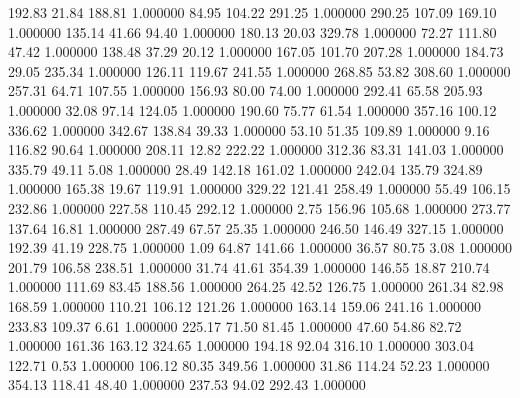     192.83     21.84    188.81  1.000000
     84.95    104.22    291.25  1.000000
    290.25    107.09    169.10  1.000000
    135.14     41.66     94.40  1.000000
    180.13     20.03    329.78  1.000000
     72.27    111.80     47.42  1.000000
    138.48     37.29     20.12  1.000000
    167.05    101.70    207.28  1.000000
    184.73     29.05    235.34  1.000000
    126.11    119.67    241.55  1.000000
    268.85     53.82    308.60  1.000000
    257.31     64.71    107.55  1.000000
    156.93     80.00     74.00  1.000000
    292.41     65.58    205.93  1.000000
     32.08     97.14    124.05  1.000000
    190.60     75.77     61.54  1.000000
    357.16    100.12    336.62  1.000000
    342.67    138.84     39.33  1.000000
     53.10     51.35    109.89  1.000000
      9.16    116.82     90.64  1.000000
    208.11     12.82    222.22  1.000000
    312.36     83.31    141.03  1.000000
    335.79     49.11      5.08  1.000000
     28.49    142.18    161.02  1.000000
    242.04    135.79    324.89  1.000000
    165.38     19.67    119.91  1.000000
    329.22    121.41    258.49  1.000000
     55.49    106.15    232.86  1.000000
    227.58    110.45    292.12  1.000000
      2.75    156.96    105.68  1.000000
    273.77    137.64     16.81  1.000000
    287.49     67.57     25.35  1.000000
    246.50    146.49    327.15  1.000000
    192.39     41.19    228.75  1.000000
      1.09     64.87    141.66  1.000000
     36.57     80.75      3.08  1.000000
    201.79    106.58    238.51  1.000000
     31.74     41.61    354.39  1.000000
    146.55     18.87    210.74  1.000000
    111.69     83.45    188.56  1.000000
    264.25     42.52    126.75  1.000000
    261.34     82.98    168.59  1.000000
    110.21    106.12    121.26  1.000000
    163.14    159.06    241.16  1.000000
    233.83    109.37      6.61  1.000000
    225.17     71.50     81.45  1.000000
     47.60     54.86     82.72  1.000000
    161.36    163.12    324.65  1.000000
    194.18     92.04    316.10  1.000000
    303.04    122.71      0.53  1.000000
    106.12     80.35    349.56  1.000000
     31.86    114.24     52.23  1.000000
    354.13    118.41     48.40  1.000000
    237.53     94.02    292.43  1.000000
